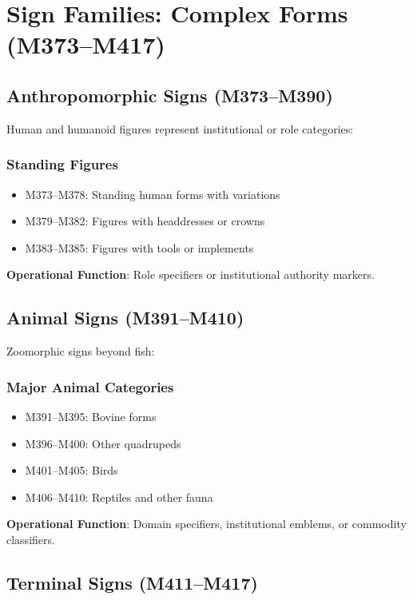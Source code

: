 \section{Sign Families: Complex Forms (M373--M417)}

\subsection{Anthropomorphic Signs (M373--M390)}

Human and humanoid figures represent institutional or role categories:

\subsubsection{Standing Figures}
\begin{itemize}
    \item M373--M378: Standing human forms with variations
    \item M379--M382: Figures with headdresses or crowns
    \item M383--M385: Figures with tools or implements
\end{itemize}

\textbf{Operational Function}: Role specifiers or institutional authority markers.

\subsection{Animal Signs (M391--M410)}

Zoomorphic signs beyond fish:

\subsubsection{Major Animal Categories}
\begin{itemize}
    \item M391--M395: Bovine forms
    \item M396--M400: Other quadrupeds
    \item M401--M405: Birds
    \item M406--M410: Reptiles and other fauna
\end{itemize}

\textbf{Operational Function}: Domain specifiers, institutional emblems, or commodity classifiers.

\subsection{Terminal Signs (M411--M417)}

